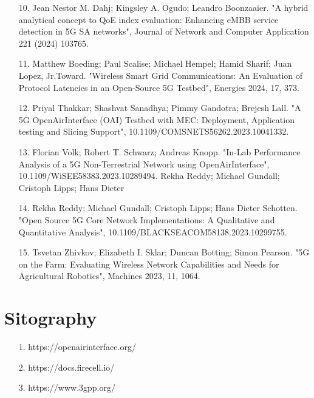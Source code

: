 \documentclass{report}
\begin{document}
\begin{itemize}
	\item[10.] Jean Nestor M. Dahj; Kingsley A. Ogudo; Leandro Boonzaaier. "A hybrid analytical concept to QoE index evaluation: Enhancing eMBB service detection in 5G SA networks", Journal of Network and Computer Application 221 (2024) 103765.
	\item[11.] Matthew Boeding; Paul Scalise; Michael Hempel; Hamid Sharif; Juan Lopez, Jr.Toward. "Wireless Smart Grid Communications: An Evaluation of Protocol Latencies in an Open-Source 5G Testbed", Energies 2024, 17, 373.
	\item[12.] Priyal Thakkar; Shashvat Sanadhya; Pimmy Gandotra; Brejesh Lall. "A 5G OpenAirInterface (OAI) Testbed with MEC: Deployment, Application testing and Slicing Support", 10.1109/COMSNETS56262.2023.10041332.
	\item[13.] Florian Volk; Robert T. Schwarz; Andreas Knopp. "In-Lab Performance Analysis of a 5G Non-Terrestrial Network using OpenAirInterface", 10.1109/WiSEE58383.2023.10289494.
	Rekha Reddy; Michael Gundall; Cristoph Lipps; Hans Dieter \item[14.] Rekha Reddy; Michael Gundall; Cristoph Lipps; Hans Dieter Schotten. "Open Source 5G Core Network Implementations: A Qualitative and Quantitative Analysis", 10.1109/BLACKSEACOM58138.2023.10299755.
	\item[15.] Tsvetan Zhivkov; Elizabeth I. Sklar; Duncan Botting; Simon Pearson. "5G on the Farm: Evaluating Wireless Network Capabilities and Needs for Agricultural Robotics", Machines 2023, 11, 1064.
\end{itemize}
\chapter{Sitography}
\begin{itemize}
	\item[1.] https://openairinterface.org/
	\item[2.] https://docs.firecell.io/
	\item[3.] https://www.3gpp.org/
\end{itemize}
\end{document}
